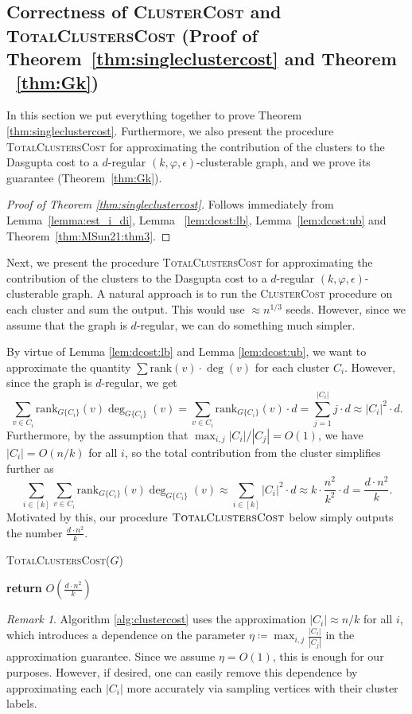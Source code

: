 \documentclass[letterpaper,11pt]{article}
\newcommand{\rank}{\mathrm{rank}}
\theoremstyle{plain}
\theoremstyle{definition}
\theoremstyle{remark}
\newtheorem{remark}[theorem]{Remark}
\newcommand{\return}{\textbf{return }}
\begin{document}
\subsection{Correctness of \textsc{ClusterCost} and \textsc{TotalClustersCost} (Proof of Theorem~\ref{thm:singleclustercost} and Theorem ~\ref{thm:Gk})} \label{sec:clustercost}
In this section we put everything together to prove Theorem \ref{thm:singleclustercost}. Furthermore, we also present the 
procedure \textsc{TotalClustersCost} for approximating the contribution of the clusters to the Dasgupta cost to a $d$-regular $(k, \varphi, \epsilon)$-clusterable graph, and we prove its guarantee (Theorem~\ref{thm:Gk}).  
\singleclustercost*

\begin{proof}[Proof of Theorem \ref{thm:singleclustercost}]
	Follows immediately from Lemma~\ref{lemma:est_i_di}, Lemma ~\ref{lem:dcost:lb}, Lemma~\ref{lem:dcost:ub} and Theorem~\ref{thm:MSun21:thm3}.  
\end{proof}

Next, we present the procedure \textsc{TotalClustersCost} for approximating the contribution of the clusters to the Dasgupta cost to a $d$-regular $(k, \varphi, \epsilon)$-clusterable graph. A natural approach is to run the \textsc{ClusterCost} procedure on each cluster and sum the output. This would use $\approx n^{1/3}$ seeds. However, since we assume that the graph is $d$-regular, we can do something much simpler. 

By virtue of Lemma \ref{lem:dcost:lb} and Lemma \ref{lem:dcost:ub}, we want to approximate the quantity $\sum \rank(v) \cdot \deg(v)$ for each cluster $C_i$. However, since the graph is $d$-regular, we get 
$$\sum_{v \in C_i} \rank_{G\{C_i\}}(v) \deg_{G\{C_i\}}(v) = \sum_{v \in C_i}\rank_{G\{C_i\}}(v) \cdot d  = \sum_{j =1}^{|C_i|} j \cdot d \approx |C_i|^2 \cdot d.$$
Furthermore, by the assumption that $\max_{i,j}|C_i|/|C_j| =  O(1)$, we have $|C_i| = O(n/k)$ for all $i$, so the total contribution from the cluster simplifies further as
$$\sum_{i \in [k]}\sum_{v \in C_i} \rank_{G\{C_i\}}(v) \deg_{G\{C_i\}}(v) \approx \sum_{i \in [k]} |C_i|^2 \cdot d   \approx k \cdot \frac{n^2}{k^2} \cdot d = \frac{d \cdot n^2}{k}.$$
Motivated by this, our procedure $\textsc{TotalClustersCost}$ below simply outputs the number $\frac{d \cdot n^2}{k}$. 

\begin{algorithm}[H]
	\caption{\textsc{TotalClustersCost}($G$)}
	\label{alg:clustercost}
	\begin{algorithmic}[1]
		\STATE\return $O \left( \frac{d \cdot n^2}{k}\right)$
	\end{algorithmic}
\end{algorithm}
\begin{remark} Algorithm \ref{alg:clustercost} uses the approximation $|C_i| \approx n/k$ for all $i$, which introduces a dependence on the parameter $\eta \coloneqq \max_{i,j} \frac{|C_i|}{|C_j|}$ in the approximation guarantee. Since we assume $\eta = O(1)$, this is enough for our purposes. However, if desired, one can easily remove this dependence by approximating each $|C_i|$ more accurately via sampling vertices with their cluster labels.
\end{remark}
\end{document}
